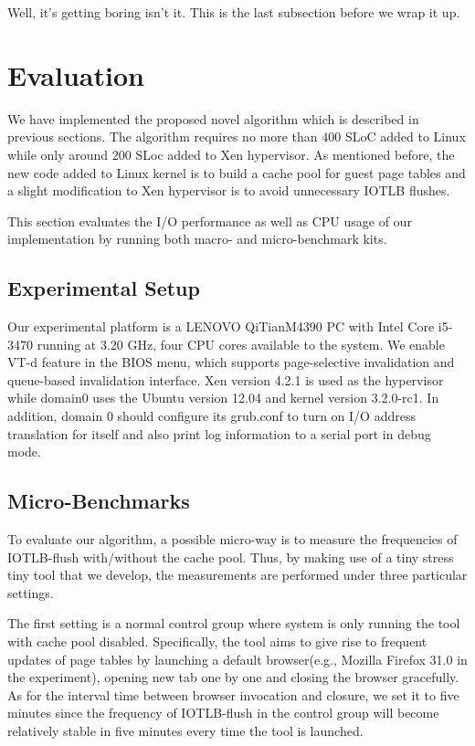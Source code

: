 \documentclass[letterpaper,twocolumn,10pt]{article}
\begin{document}
Well, it's getting boring isn't it.  This is the last subsection
before we wrap it up.

\section{Evaluation}

We have implemented the proposed novel algorithm which is described in previous sections. The algorithm requires no more than $400$ SLoC added to Linux while only around $200$ SLoc added to Xen hypervisor. As mentioned before, the new code added to Linux kernel is to build a cache pool for guest page tables and a slight modification to Xen hypervisor is to avoid unnecessary IOTLB flushes.

This section evaluates the I/O performance as well as CPU usage of our implementation by running both macro- and micro-benchmark kits.

\subsection{Experimental Setup}

Our experimental platform is a LENOVO QiTianM4390 PC with Intel Core i5-3470 running at 3.20 GHz, four CPU cores available to the system. We enable VT-d feature in the BIOS menu, which supports page-selective invalidation and queue-based invalidation interface. Xen version 4.2.1 is used as the hypervisor while domain0 uses the Ubuntu version 12.04 and kernel version 3.2.0-rc1. In addition, domain 0 should configure its grub.conf to turn on I/O address translation for itself and also print log information to a serial port in debug mode.

\subsection{Micro-Benchmarks}

To evaluate our algorithm, a possible micro-way is to measure the frequencies of IOTLB-flush with/without the cache pool. Thus, by making use of a tiny stress tiny tool that we develop, the measurements are performed under three particular settings.

The first setting is a normal control group where system is only running the tool with cache pool disabled. Specifically, the tool aims to give rise to frequent updates of page tables by launching a default browser(e.g., Mozilla Firefox 31.0 in the experiment), opening new tab one by one and closing the browser gracefully. As for the interval time between browser invocation and closure, we set it to five minutes since the frequency of IOTLB-flush in the control group will become relatively stable in five minutes every time the tool is launched.
\end{document}
